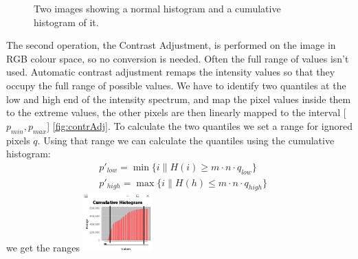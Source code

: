 \documentclass[journal,transmag]{IEEEtran}
\begin{document}
\begin{figure}[h] %
	\centering
	\caption{Two images showing a normal histogram and a cumulative histogram of it.}
	\label{fig:hist_comp}
\end{figure}
\begin{figure}
	\centering
\end{figure}
The second operation, the Contrast Adjustment, is performed on the image in RGB colour space, so no conversion is needed. Often the full range of values isn't used. Automatic contrast adjustment remaps the intensity values so that they occupy the full range of possible values\cite{automaticContrast}. We have to identify two quantiles at the low and high end of the intensity spectrum, and map the pixel values inside them to the extreme values, the other pixels are then linearly mapped to the interval [$p_{min}, p_{max}$] \ref{fig:contrAdj}. To calculate the two quantiles we set a range for ignored pixels $q$. Using that range we can calculate the quantiles using the cumulative histogram:
\begin{equation}
\begin{aligned}
&p'_{low} = \min\{i \| H(i) \geq m\cdot n \cdot q_{low}\}\\
&p'_{high} = \max\{i \| H(h) \leq m\cdot n \cdot q_{high}\}
\end{aligned}
\end{equation}
we get the ranges \includegraphics[width=0.2\textwidth]{figures/cum_hist_range.png}
\end{document}
